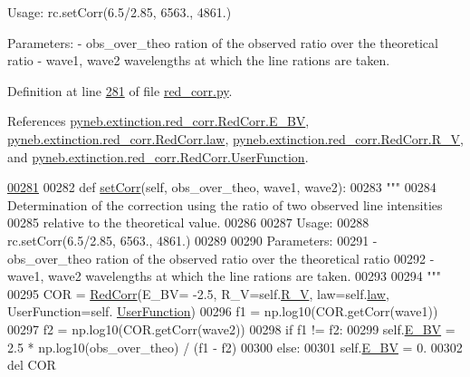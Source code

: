 \begin{DoxyVerb}
\begin{DoxyVerb}
Usage:
    rc.setCorr(6.5/2.85, 6563., 4861.)
    
Parameters:
    - obs_over_theo    ration of the observed ratio over the theoretical ratio
    - wave1, wave2     wavelengths at which the line rations are taken.\end{DoxyVerb}
 

Definition at line \hyperlink{red__corr_8py_source_l00281}{281} of file \hyperlink{red__corr_8py_source}{red\-\_\-corr.\-py}.



References \hyperlink{red__corr_8py_source_l00203}{pyneb.\-extinction.\-red\-\_\-corr.\-Red\-Corr.\-E\-\_\-\-B\-V}, \hyperlink{red__corr_8py_source_l00205}{pyneb.\-extinction.\-red\-\_\-corr.\-Red\-Corr.\-law}, \hyperlink{red__corr_8py_source_l00204}{pyneb.\-extinction.\-red\-\_\-corr.\-Red\-Corr.\-R\-\_\-\-V}, and \hyperlink{red__corr_8py_source_l00208}{pyneb.\-extinction.\-red\-\_\-corr.\-Red\-Corr.\-User\-Function}.


\begin{DoxyCode}
\hypertarget{classpyneb_1_1extinction_1_1red__corr_1_1_red_corr_l00281}{}\hyperlink{classpyneb_1_1extinction_1_1red__corr_1_1_red_corr_a75e8027a7bd81d214ac16db221da8073}{00281} 
00282     \textcolor{keyword}{def }\hyperlink{classpyneb_1_1extinction_1_1red__corr_1_1_red_corr_a75e8027a7bd81d214ac16db221da8073}{setCorr}(self, obs\_over\_theo, wave1, wave2):
00283         \textcolor{stringliteral}{"""}
00284 \textcolor{stringliteral}{        Determination of the correction using the ratio of two observed line intensities }
00285 \textcolor{stringliteral}{            relative to the theoretical value.}
00286 \textcolor{stringliteral}{        }
00287 \textcolor{stringliteral}{        Usage:}
00288 \textcolor{stringliteral}{            rc.setCorr(6.5/2.85, 6563., 4861.)}
00289 \textcolor{stringliteral}{            }
00290 \textcolor{stringliteral}{        Parameters:}
00291 \textcolor{stringliteral}{            - obs\_over\_theo    ration of the observed ratio over the theoretical ratio}
00292 \textcolor{stringliteral}{            - wave1, wave2     wavelengths at which the line rations are taken.}
00293 \textcolor{stringliteral}{}
00294 \textcolor{stringliteral}{        """}
00295         COR = \hyperlink{classpyneb_1_1extinction_1_1red__corr_1_1_red_corr}{RedCorr}(E\_BV= -2.5, R\_V=self.\hyperlink{classpyneb_1_1extinction_1_1red__corr_1_1_red_corr_a4696ecdd84c912c20e6aa19b1573e875}{R\_V}, law=self.\hyperlink{classpyneb_1_1extinction_1_1red__corr_1_1_red_corr_adfed423013315bad4ba5dda2368dc3d0}{law}, UserFunction=self.
      \hyperlink{classpyneb_1_1extinction_1_1red__corr_1_1_red_corr_a41b35235a0952185b3c7e34f6835511e}{UserFunction})
00296         f1 = np.log10(COR.getCorr(wave1))
00297         f2 = np.log10(COR.getCorr(wave2))
00298         \textcolor{keywordflow}{if} f1 != f2:
00299             self.\hyperlink{classpyneb_1_1extinction_1_1red__corr_1_1_red_corr_a0bc581bcaa8eeeb67b83ffdec58bf164}{E\_BV} = 2.5 * np.log10(obs\_over\_theo) / (f1 - f2)
00300         \textcolor{keywordflow}{else}:
00301             self.\hyperlink{classpyneb_1_1extinction_1_1red__corr_1_1_red_corr_a0bc581bcaa8eeeb67b83ffdec58bf164}{E\_BV} = 0.
00302         del COR


\end{DoxyCode}
\end{DoxyVerb}
